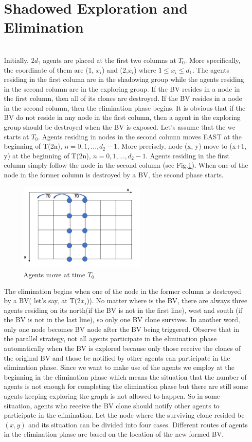 \section{Shadowed Exploration and Elimination}
 \\
Initially, 2$d_1$ agents are placed at the first two columns at $T_0$. More specifically, the coordinate of them are (1, $x_i$) and (2,$x_i$) where $1\leq x_i\leq d_1$. The agents residing in the first column are in the shadowing group while the agents residing in the second column are in the exploring group. If the BV resides in a node in the first column, then all of its clones are destroyed. If the BV resides in a node in the second column, then the elimination phase begins. It is obvious that if the BV do not reside in any node in the first column, then a agent in the exploring group should be destroyed when the BV is exposed.  Let's assume that the we starts at $T_0$. Agents residing in nodes in the second column moves EAST at the beginning of T(2n), $n=0,1, \ldots ,d_2-1$. More precisely, node (x, y) move to (x+1, y) at the beginning of T(2n), $n=0,1, \dots , d_2-1$. Agents residing in the first column simply follow the node in the second column (see  Fig.\ref{fig:TShE}). When one of the node in the former column is destroyed by a BV, the second phase starts.
\begin{figure}[H]
  \centering  
  \includegraphics[width=2.5in]{figures/TShE.png}
  \caption{Agents move at time $T_0$}\label{fig:TShE}
\end{figure}
The elimination begins when one of the node in the former column is destroyed by a BV( let's say, at T(2$x_i$)). No matter where is the BV, there are always three agents residing on its north(if the BV is not in the first line), west and south (if the BV is not in the last line), so only one BV clone survives. In another word, only one node becomes BV node after the BV being triggered.  Observe that in the parallel strategy, not all agents participate in the elimination phase automatically when the BV is explored because only those receive the clones of the original BV and those be notified by other agents can participate in the elimination phase. Since we want to make use of the agents we employ at the beginning in the elimination phase which means the situation that the number of agents is not enough for completing the elimination phase but there are still some agents keeping exploring the graph is not allowed to happen. So in some situation, agents who receive the BV clone should notify other agents to participate in the elimination.  Let the node where the surviving clone resided be $(x, y)$ and its situation can be divided into four cases. Different routes of agents in the elimination phase are based on the location of the new formed BV.
